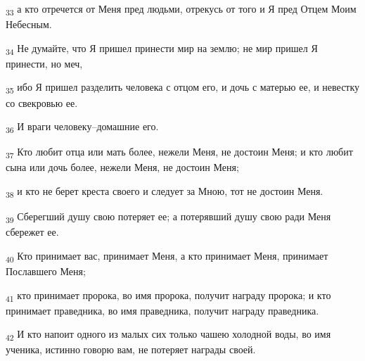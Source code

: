 \begin{tcolorbox}
\textsubscript{33} а кто отречется от Меня пред людьми, отрекусь от того и Я пред Отцем Моим Небесным.
\end{tcolorbox}
\begin{tcolorbox}
\textsubscript{34} Не думайте, что Я пришел принести мир на землю; не мир пришел Я принести, но меч,
\end{tcolorbox}
\begin{tcolorbox}
\textsubscript{35} ибо Я пришел разделить человека с отцом его, и дочь с матерью ее, и невестку со свекровью ее.
\end{tcolorbox}
\begin{tcolorbox}
\textsubscript{36} И враги человеку--домашние его.
\end{tcolorbox}
\begin{tcolorbox}
\textsubscript{37} Кто любит отца или мать более, нежели Меня, не достоин Меня; и кто любит сына или дочь более, нежели Меня, не достоин Меня;
\end{tcolorbox}
\begin{tcolorbox}
\textsubscript{38} и кто не берет креста своего и следует за Мною, тот не достоин Меня.
\end{tcolorbox}
\begin{tcolorbox}
\textsubscript{39} Сберегший душу свою потеряет ее; а потерявший душу свою ради Меня сбережет ее.
\end{tcolorbox}
\begin{tcolorbox}
\textsubscript{40} Кто принимает вас, принимает Меня, а кто принимает Меня, принимает Пославшего Меня;
\end{tcolorbox}
\begin{tcolorbox}
\textsubscript{41} кто принимает пророка, во имя пророка, получит награду пророка; и кто принимает праведника, во имя праведника, получит награду праведника.
\end{tcolorbox}
\begin{tcolorbox}
\textsubscript{42} И кто напоит одного из малых сих только чашею холодной воды, во имя ученика, истинно говорю вам, не потеряет награды своей.
\end{tcolorbox}
